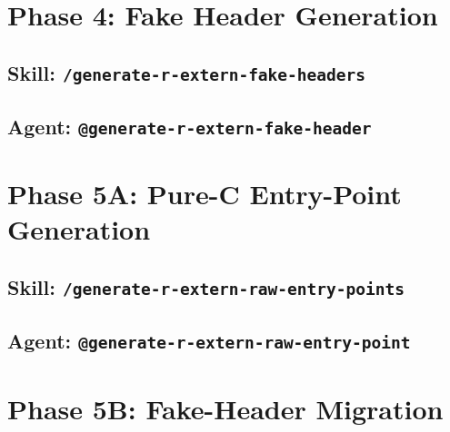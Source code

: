 \documentclass[12pt]{article}
\begin{document}


\section{Phase 4: Fake Header Generation}
\label{app:phase4}

\subsection{Skill: \texttt{/generate-r-extern-fake-headers}}
\label{app:skill:generate-r-extern-fake-headers}



\subsection{Agent: \texttt{@generate-r-extern-fake-header}}
\label{app:agent:generate-r-extern-fake-header}



\section{Phase 5A: Pure-C Entry-Point Generation}
\label{app:phase5a}

\subsection{Skill: \texttt{/generate-r-extern-raw-entry-points}}
\label{app:skill:generate-r-extern-raw-entry-points}



\subsection{Agent: \texttt{@generate-r-extern-raw-entry-point}}
\label{app:agent:generate-r-extern-raw-entry-point}



\section{Phase 5B: Fake-Header Migration}
\label{app:phase5b}
\end{document}
